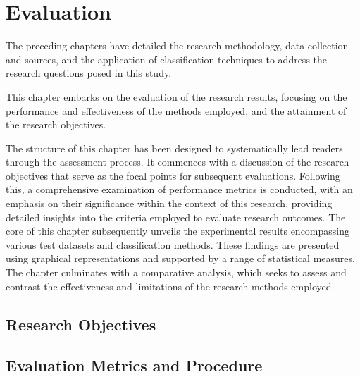 \section{Evaluation}
\label{sec:evaluation}

The preceding chapters have detailed the research methodology, data collection and sources, and the application of classification techniques 
to address the research questions posed in this study. 

This chapter embarks on the evaluation of the research results, focusing on the performance and effectiveness of the methods employed, 
and the attainment of the research objectives.

The structure of this chapter has been designed to systematically lead readers through the assessment process. 
It commences with a discussion of the research objectives that serve as the focal points for subsequent evaluations. 
Following this, a comprehensive examination of performance metrics is conducted, with an emphasis on their 
significance within the context of this research, providing detailed insights into the criteria employed 
to evaluate research outcomes.
The core of this chapter subsequently unveils the experimental results encompassing various test datasets 
and classification methods. 
These findings are presented using graphical representations and supported by a range of statistical measures.
The chapter culminates with a comparative analysis, which seeks to assess and contrast the effectiveness and 
limitations of the research methods employed.

\subsection{Research Objectives}
\label{subsec:research_objectives}







\subsection{Evaluation Metrics and Procedure}
\label{subsec:determinationInconcl}

